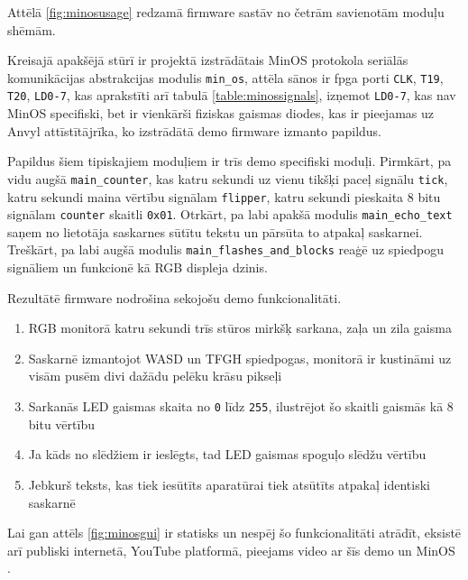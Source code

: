 Attēlā \ref{fig:minosusage} redzamā \gls{firmware} sastāv no četrām savienotām
moduļu shēmām. 

Kreisajā apakšējā stūrī ir projektā izstrādātais MinOS protokola seriālās
komunikācijas abstrakcijas modulis \lstinline!min_os!, attēla sānos ir
\gls{fpga} porti \lstinline!CLK!, \lstinline!T19!, \lstinline!T20!,
\lstinline!LD0-7!, kas aprakstīti arī tabulā \ref{table:minossignals}, izņemot
\lstinline!LD0-7!, kas nav MinOS specifiski, bet ir vienkārši fiziskas gaismas
diodes, kas ir pieejamas uz Anvyl attīstītājrīka, ko izstrādātā demo
\gls{firmware} izmanto papildus. 

Papildus šiem tipiskajiem moduļiem ir trīs demo
 specifiski moduļi. Pirmkārt, pa vidu
augšā \lstinline!main_counter!, kas katru sekundi uz vienu tikšķi paceļ signālu
\lstinline!tick!, katru sekundi maina vērtību signālam \lstinline!flipper!,
katru sekundi pieskaita 8 bitu signālam \lstinline!counter! skaitli
\lstinline!0x01!. Otrkārt, pa labi apakšā modulis \lstinline!main_echo_text!
saņem no lietotāja saskarnes sūtītu tekstu un pārsūta to atpakaļ saskarnei.
Treškārt, pa labi augšā modulis \lstinline!main_flashes_and_blocks! reaģē uz
spiedpogu signāliem un funkcionē kā RGB displeja dzinis.

Rezultātē \gls{firmware} nodrošina sekojošu  demo funkcionalitāti.
\begin{enumerate}
    \item RGB monitorā katru sekundi trīs stūros mirkšķ sarkana, zaļa un zila
        gaisma
    \item Saskarnē izmantojot WASD un TFGH spiedpogas, monitorā ir kustināmi uz
        visām pusēm divi dažādu pelēku krāsu pikseļi
    \item Sarkanās LED gaismas skaita no \lstinline!0! līdz \lstinline!255!,
        ilustrējot šo skaitli gaismās kā 8 bitu vērtību
    \item Ja kāds no slēdžiem ir ieslēgts, tad LED gaismas spoguļo slēdžu
        vērtību
    \item Jebkurš teksts, kas tiek iesūtīts aparatūrai tiek atsūtīts atpakaļ
        identiski saskarnē
\end{enumerate}

Lai gan attēls \ref{fig:minosgui} ir statisks un nespēj šo funkcionalitāti
atrādīt, eksistē arī publiski internetā, YouTube platformā, pieejams video ar
šīs demo  un MinOS
.
\cite{VeinbahsKrisjanisDemo} 

